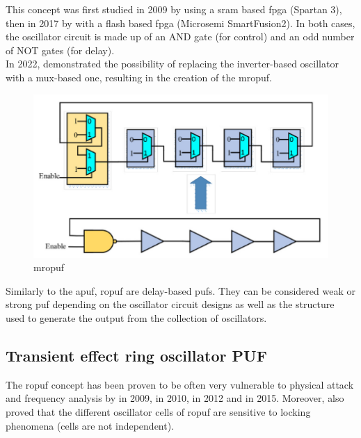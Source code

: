 This concept was first studied in 2009 by \cite{maiti_improved_2009} using a \acrshort{sram} based \acrshort{fpga} (Spartan 3), then in 2017 by \cite{mureddu_efficient_2017} with a flash based \acrshort{fpga} (Microsemi SmartFusion2). In both cases, the oscillator circuit is made up of an AND gate (for control) and an odd number of NOT gates (for delay).\\

In 2022, \cite{yao_m-ro_2022} demonstrated the possibility of replacing the inverter-based oscillator with a \acrshort{mux}-based one, resulting in the creation of the \acrfull{mropuf}.

\begin{figure}[H]
    \centering
    \includegraphics[width=0.7\linewidth]{images/MUX_ROPUF_YAO.png}
    \caption{\acrshort{mropuf} \cite{yao_m-ro_2022}}
    \label{fig:MUXROPUF}
\end{figure}

Similarly to the \acrshort{apuf}, \acrshort{ropuf} are delay-based \acrshort{puf}s. They can be considered weak or strong \acrshort{puf} depending on the oscillator circuit designs as well as the structure used to generate the output from the collection of oscillators.



\subsection{Transient effect ring oscillator PUF}
\label{subsubsec:intr_tero_puf}

The \acrshort{ropuf} concept has been proven to be often very vulnerable to physical attack and frequency analysis by \cite{clavier_frequency_2009} in 2009, \cite{bochard_true-randomness_2010} in 2010, \cite{hutchison_contactless_2012} in 2012 and \cite{bossuet_ultra-lightweight_2015} in 2015. Moreover, \cite{bochard_true-randomness_2010} also proved that the different oscillator cells of \acrshort{ropuf} are sensitive to locking phenomena (cells are not independent).\\

